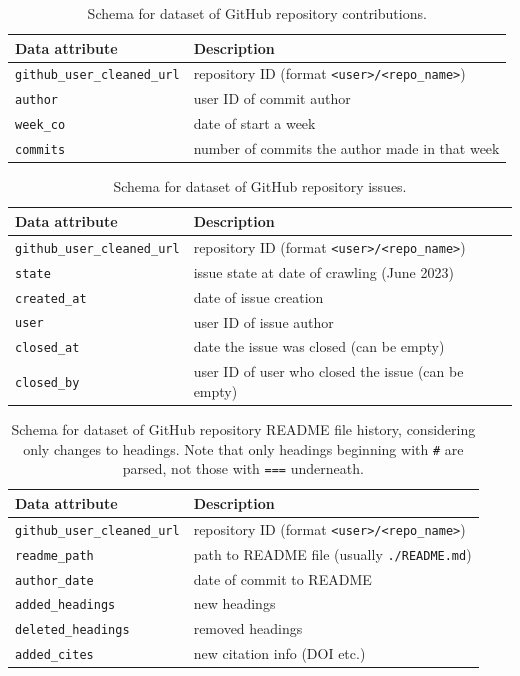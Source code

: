 \documentclass[10pt,a4paper]{scrartcl}
\begin{document}
\begin{table}
    \centering
    \begin{tabular}{l|l}
        \hline
        Data attribute & Description \\
        \hline
        \verb|github_user_cleaned_url| & repository ID (format \verb|<user>/<repo_name>|) \\
        \verb|author| & user ID of commit author \\
        \verb|week_co| & date of start a week \\
        \verb|commits| & number of commits the author made in that week \\
        \hline
    \end{tabular}
    \caption{Schema for dataset of GitHub repository contributions.}
    \label{table:contributions}
\end{table}

\begin{table}
    \centering
    \begin{tabular}{l|l}
        \hline
        Data attribute & Description \\
        \hline
        \verb|github_user_cleaned_url| & repository ID (format \verb|<user>/<repo_name>|) \\
        \verb|state| & issue state at date of crawling (June 2023) \\
        \verb|created_at| & date of issue creation \\
        \verb|user| & user ID of issue author \\
        \verb|closed_at| & date the issue was closed (can be empty) \\
        \verb|closed_by| & user ID of user who closed the issue (can be empty) \\
        \hline
    \end{tabular}
    \caption{Schema for dataset of GitHub repository issues.}
    \label{table:issues}
\end{table}

\begin{table}
    \centering
    \begin{tabular}{l|l}
        \hline
        Data attribute & Description \\
        \hline
        \verb|github_user_cleaned_url| & repository ID (format \verb|<user>/<repo_name>|) \\
        \verb|readme_path| & path to README file (usually \verb|./README.md|) \\
        \verb|author_date| & date of commit to README \\
        \verb|added_headings| & new headings \\
        \verb|deleted_headings| & removed headings \\
        \verb|added_cites| & new citation info (DOI etc.) \\
        \hline
    \end{tabular}
    \caption{Schema for dataset of GitHub repository README file history, considering only changes to headings. Note that only headings beginning with \texttt{\#} are parsed, not those with \texttt{===} underneath.}
    \label{table:readme_headings}
\end{table}
\end{document}
